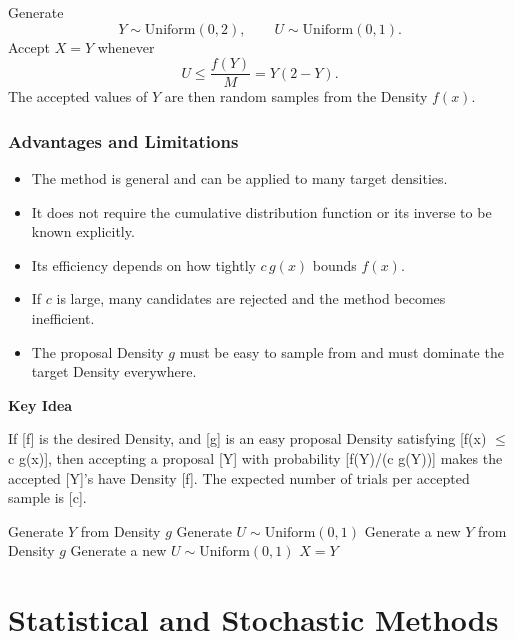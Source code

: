 \documentclass[a4paper, 10pt, onepage]{elegantbook}
\begin{document}
{Generate
\[
Y\sim\mathrm{Uniform}(0,2),
\qquad
U\sim\mathrm{Uniform}(0,1).
\]
Accept \(X=Y\) whenever
\[
U\leq\frac{f(Y)}{M}=Y(2-Y).
\]
The accepted values of \(Y\) are then random samples from the Density
\(f(x)\).

\subsection{Advantages and Limitations}

\noindent

\begin{itemize}
    \item The method is general and can be applied to many target densities.
    \item It does not require the cumulative distribution function or its
    inverse to be known explicitly.
    \item Its efficiency depends on how tightly \(c\,g(x)\) bounds \(f(x)\).
    \item If \(c\) is large, many candidates are rejected and the method
    becomes inefficient.
    \item The proposal Density \(g\) must be easy to sample from and must
    dominate the target Density everywhere.
\end{itemize}

\medskip

    \textbf{Key Idea}  

\noindent

If [f] is the desired Density, and [g] is an easy proposal Density satisfying [f(x) $\le$ c g(x)], 
then accepting a proposal [Y] with probability [f(Y)/(c g(Y))] makes the accepted [Y]’s have Density [f]. 
The expected number of trials per accepted sample is [c].  

\begin{algorithmic}[1]
\State Generate \(Y\) from Density \(g\)
\State Generate \(U\sim\mathrm{Uniform}(0,1)\)
    \State Generate a new \(Y\) from Density \(g\)
    \State Generate a new \(U\sim\mathrm{Uniform}(0,1)\)
\EndWhile
\State \Return \(X=Y\)
\end{algorithmic}

\newpage

\chapter{Statistical and Stochastic Methods}

\noindent

}
\end{document}
